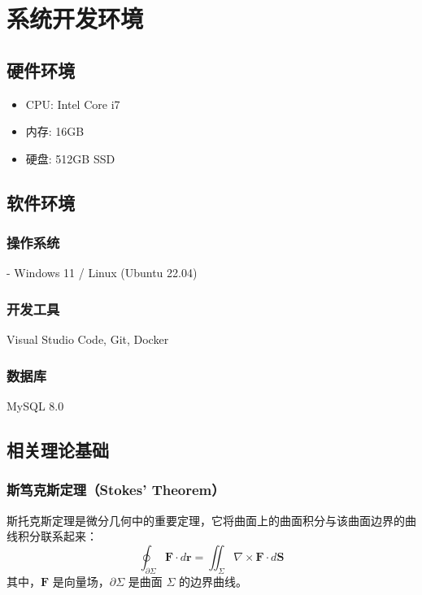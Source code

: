 \section{系统开发环境}

\subsection{硬件环境}
\begin{itemize}[nosep, leftmargin=2em]
    \item CPU: Intel Core i7
    \item 内存: 16GB
    \item 硬盘: 512GB SSD
\end{itemize}

\subsection{软件环境}
\subsubsection{操作系统}
- Windows 11 / Linux (Ubuntu 22.04)

\subsubsection{开发工具}
Visual Studio Code, Git, Docker

\subsubsection{数据库}
MySQL 8.0

\subsection{相关理论基础}
\subsubsection{斯笃克斯定理（Stokes' Theorem）}
斯托克斯定理是微分几何中的重要定理，它将曲面上的曲面积分与该曲面边界的曲线积分联系起来\cite{huo1989}：
\begin{equation}
    \oint_{\partial \Sigma} \mathbf{F} \cdot d\mathbf{r} = \iint_{\Sigma} \nabla \times \mathbf{F} \cdot d\mathbf{S}
    \label{eq:stokes_theorem}
\end{equation}
其中，$\mathbf{F}$ 是向量场，$\partial \Sigma$ 是曲面 $\Sigma$ 的边界曲线。

